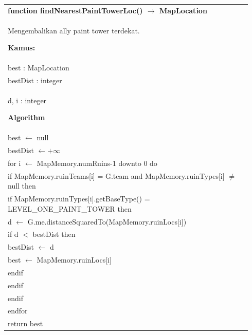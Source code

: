 \documentclass{article}
\newenvironment{pseudobox}
{
\centering
\begin{longtable}{|p{0.94\linewidth}|}
\hline
}
{
\\ \hline
\end{longtable}
\vspace{0.05cm}
}
\begin{document}
\begin{pseudobox}
\textbf{function findNearestPaintTowerLoc() $\rightarrow$ MapLocation} \\
{ Mengembalikan ally paint tower terdekat. }

\textbf{Kamus:} \\
\hspace*{1em} best : MapLocation \\
\hspace*{1em} bestDist : integer \\
\hspace*{1em} d, i : integer

\textbf{Algorithm} \\
\hspace*{1em} best $\leftarrow$ null \\
\hspace*{1em} bestDist $\leftarrow +\infty$ \\

\hspace*{1em} for i $\leftarrow$ MapMemory.numRuins-1 downto 0 do \\
\hspace*{2em} if MapMemory.ruinTeams[i] = G.team and MapMemory.ruinTypes[i] $\neq$ null then \\
\hspace*{3em} if MapMemory.ruinTypes[i].getBaseType() = LEVEL\_ONE\_PAINT\_TOWER then \\
\hspace*{4em} d $\leftarrow$ G.me.distanceSquaredTo(MapMemory.ruinLocs[i]) \\
\hspace*{4em} if d $<$ bestDist then \\
\hspace*{5em} bestDist $\leftarrow$ d \\
\hspace*{5em} best $\leftarrow$ MapMemory.ruinLocs[i] \\
\hspace*{4em} endif \\
\hspace*{3em} endif \\
\hspace*{2em} endif \\
\hspace*{1em} endfor \\

\hspace*{1em} return best
\end{pseudobox}
\end{document}

